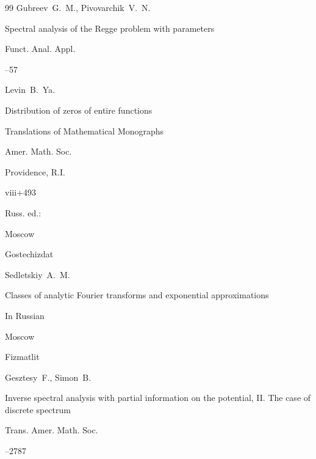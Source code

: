 \begin{thebibliography}{99}
\by Gubreev~G.~M., Pivovarchik~V.~N.

\paper Spectral analysis of the Regge problem with parameters


\jour Funct. Anal. Appl.




–57






\by Levin~B.~Ya.


\book Distribution of zeros of entire functions

\serial Translations of Mathematical Monographs

\publ Amer. Math. Soc. 

\publ Providence, R.I.


\totalpages viii+493 

\moreref Russ. ed.:

\publaddr Moscow

\publ Gostechizdat







\by Sedletskiy~A.~M. 

\book  Classes of analytic Fourier transforms and exponential approximations

\lang In Russian

\publaddr Moscow

\publ Fizmatlit






\by Gesztesy~F., Simon~B. 

\paper Inverse spectral analysis with partial information on the potential, II. The case of discrete spectrum

\jour Trans. Amer. Math. Soc. 





--2787 



\end{thebibliography}




